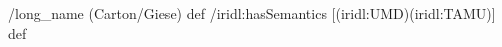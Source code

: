 \begin{ingrid}
/long_name (Carton/Giese) def
/iridl:hasSemantics [(iridl:UMD)(iridl:TAMU)] def
\end{ingrid}
